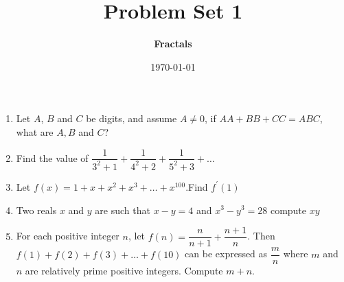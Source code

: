 \documentclass[a4paper]{article}
\begin{document}
\author{\textbf{Fractals}}
\title{\textbf{Problem Set 1}}
\date {\today}
\maketitle
\noindent
\begin{enumerate}
    \item Let $A$, $B$ and $C$ be digits, and assume $A\neq 0$, 
        if $AA + BB + CC = ABC$, what are $A, B$ and $C$?

    \item  Find the value of $\dfrac{1}{3^2+1}+
        \dfrac{1}{4^2+2}+\dfrac{1}{5^2+3} + \dots$

    \item Let $f(x) = 1 + x + x^2 + x^3 + \dots+ x^{100}$.Find $f^\prime(1)$
    \item Two reals $x$ and $y$ are such that $x - y = 4$ and $x^3 - y^3 = 28$ compute $xy$ 

    \item  For each positive integer $n$, let $f(n) = \dfrac{n}{n+1} + \dfrac{n+1}{n}$. Then $f (1) + f (2) + f (3) + 
    \dots + f (10)$ can be expressed as $\dfrac{m}{n}$ where $m$ and $n$ are relatively prime positive integers. Compute $m + n$.
\end{enumerate}
\end{document}
